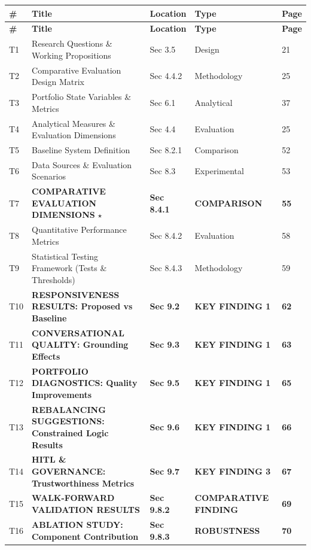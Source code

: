 \documentclass[11pt]{article}
\begin{document}
\begin{longtable}{C{1cm}L{7.8cm}L{1.9cm}L{1.9cm}C{1cm}}
\toprule
\textbf{\#} & \textbf{Title} & \textbf{Location} & \textbf{Type} & \textbf{Page} \\
\midrule
\endfirsthead
\toprule
\textbf{\#} & \textbf{Title} & \textbf{Location} & \textbf{Type} & \textbf{Page} \\
\midrule
\endhead
T1 & Research Questions \& Working Propositions & Sec 3.5 & Design & 21 \\
T2 & Comparative Evaluation Design Matrix & Sec 4.4.2 & Methodology & 25 \\
T3 & Portfolio State Variables \& Metrics & Sec 6.1 & Analytical & 37 \\
T4 & Analytical Measures \& Evaluation Dimensions & Sec 4.4 & Evaluation & 25 \\
T5 & Baseline System Definition & Sec 8.2.1 & Comparison & 52 \\
T6 & Data Sources \& Evaluation Scenarios & Sec 8.3 & Experimental & 53 \\
T7 & \textbf{COMPARATIVE EVALUATION DIMENSIONS} $\star$ & \textbf{Sec 8.4.1} & \textbf{COMPARISON} & \textbf{55} \\
T8 & Quantitative Performance Metrics & Sec 8.4.2 & Evaluation & 58 \\
T9 & Statistical Testing Framework (Tests \& Thresholds) & Sec 8.4.3 & Methodology & 59 \\
T10 & \textbf{RESPONSIVENESS RESULTS: Proposed vs Baseline} & \textbf{Sec 9.2} & \textbf{KEY FINDING 1} & \textbf{62} \\
T11 & \textbf{CONVERSATIONAL QUALITY: Grounding Effects} & \textbf{Sec 9.3} & \textbf{KEY FINDING 1} & \textbf{63} \\
T12 & \textbf{PORTFOLIO DIAGNOSTICS: Quality Improvements} & \textbf{Sec 9.5} & \textbf{KEY FINDING 1} & \textbf{65} \\
T13 & \textbf{REBALANCING SUGGESTIONS: Constrained Logic Results} & \textbf{Sec 9.6} & \textbf{KEY FINDING 1} & \textbf{66} \\
T14 & \textbf{HITL \& GOVERNANCE: Trustworthiness Metrics} & \textbf{Sec 9.7} & \textbf{KEY FINDING 3} & \textbf{67} \\
T15 & \textbf{WALK-FORWARD VALIDATION RESULTS} & \textbf{Sec 9.8.2} & \textbf{COMPARATIVE FINDING} & \textbf{69} \\
T16 & \textbf{ABLATION STUDY: Component Contribution} & \textbf{Sec 9.8.3} & \textbf{ROBUSTNESS} & \textbf{70} \\

\end{longtable}
\end{document}
